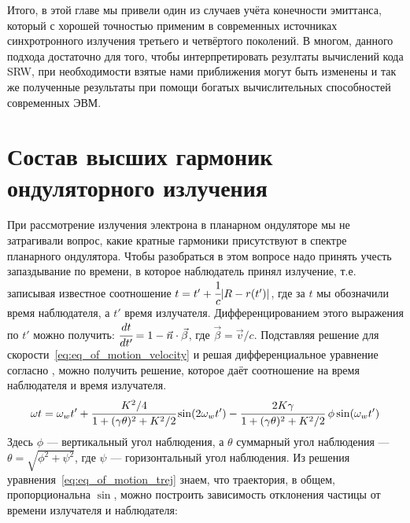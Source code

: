 Итого, в этой главе мы привели один из случаев учёта конечности эмиттанса, который с хорошей точностью применим в современных источниках синхротронного излучения третьего и четвёртого поколений. В многом, данного подхода достаточно для того, чтобы интерпретировать резултаты вычислений кода SRW, при необходимости взятые нами приближения могут быть изменены и так же полученные результаты при помощи богатых вычислительных способностей современных ЭВМ.

\chapter{Состав высших гармоник ондуляторного излучения}
При рассмотрение излучения электрона в планарном ондуляторе мы не затрагивали вопрос, какие кратные гармоники присутствуют в спектре планарного ондулятора. Чтобы разобраться в этом вопросе надо принять учесть запаздывание по времени, в которое наблюдатель принял излучение, т.е. записывая известное соотношение $t = t' + \cfrac{1}{c} |R - r(t')|$, где за $t$ мы обозначили время наблюдателя, а $t'$ время излучателя. Дифференцированием этого выражения по $t'$ можно получить: $\cfrac{dt}{dt'} = 1 - \vec{n}\cdot\vec{\beta}$, где $\vec{\beta} = \vec{v}/c$. Подставляя решение для скорости~\ref{eq:eq_of_motion_velocity} и решая дифференциальное уравнение согласно \cite{als2011elements}, можно получить решение, которое даёт соотношение на время наблюдателя и время излучателя.
\begin{equation}
\label{eq:t_t'}
\omega t = \omega_w t' + \cfrac{K^2/4}{1 + (\gamma \theta)^2 + K^2/2} \sin(2 \omega_w t') - \cfrac{2K\gamma}{1 + (\gamma \theta)^2 + K^2/2} \; \phi \sin(\omega_w t') 	
\end{equation}
Здесь $\phi$ --- вертикальный угол наблюдения, а $\theta$ суммарный угол наблюдения --- $\theta = \sqrt{\phi^2 + \psi^2}$, где $\psi$ --- горизонтальный угол наблюдения. Из решения уравнения~\ref{eq:eq_of_motion_trej} знаем, что траектория, в общем, пропорциональна $\sin$, можно построить зависимость отклонения частицы от времени излучателя и наблюдателя:
